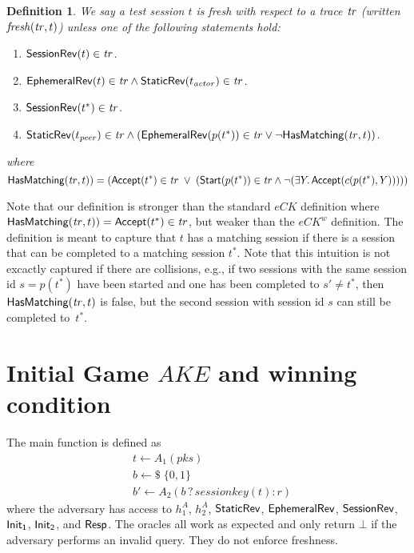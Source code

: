 \documentclass[]{article}
\newtheorem{definition}{Definition}
\begin{document}
\begin{definition}
We say a test session $t$ is fresh with respect to a trace $\mathit{tr}$ (written $\mathit{fresh}(\mathit{tr}, t)$)
  unless one of the following statements hold:
\begin{enumerate}
\item $\mathsf{SessionRev}(t) \in \mathit{tr}$.
\item $\mathsf{EphemeralRev}(t) \in \mathit{tr} \land \mathsf{StaticRev}(t_{\mathit{actor}}) \in \mathit{tr}$.
\item $\mathsf{SessionRev}(t^*) \in \mathit{tr}$.
\item $\mathsf{StaticRev}(t_{\mathit{peer}}) \in \mathit{tr} \land (\mathsf{EphemeralRev}(p(t^*)) \in \mathit{tr} \lor \neg \mathsf{HasMatching}(\mathit{tr}, t))$.
\end{enumerate}
where
\[
  \mathsf{HasMatching}(\mathit{tr}, t)) = (\mathsf{Accept}(t^*) \in \mathit{tr}\; \lor\; (\mathsf{Start}(p(t^*)) \in \mathit{tr}
    \land \neg (\exists Y.\, \mathsf{Accept}(c(p(t^*),Y)))))
\]
\end{definition}

Note that our definition is stronger than the standard $eCK$ definition where
  $\mathsf{HasMatching}(\mathit{tr}, t)) = \mathsf{Accept}(t^*) \in \mathit{tr}$, but weaker than the
  $eCK^w$ definition.
The definition is meant to capture that $t$ has a matching session if there is a session
  that can be completed to a matching session $t^*$.
Note that this intuition is not excactly captured if there are collisions, e.g., if two sessions
  with the same session id $s=p(t^*)$ have been started and one has been completed to $s' \neq t^*$,
  then $\mathsf{HasMatching}(\mathit{tr}, t)$ is false, but the second session with session id $s$ can
  still be completed to~$t^*$. 

\newcommand{\Ake}{\mathsf{AKE}}
\newcommand{\Ev}[1]{\mathit{Ev}_{#1}}

\section{Initial Game $AKE$ and winning condition}

The main function is defined as
\begin{align*}
& t \leftarrow A_1(pks) \\
& b \leftarrow\!\!\$ \; \{0,1\} \\
& b' \leftarrow A_2(b\, ?\, sessionkey(t) : r)
\end{align*}
where the adversary has access to $h_1^A$, $h_2^A$, $\mathsf{StaticRev}$,
  $\mathsf{EphemeralRev}$, $\mathsf{SessionRev}$, $\mathsf{Init_1}$, $\mathsf{Init_2}$, and $\mathsf{Resp}$.
The oracles all work as expected and only return $\bot$ if the adversary
  performs an invalid query.
They do not enforce freshness.
\end{document}
